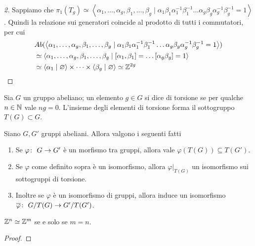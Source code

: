 \begin{proof}[2]
	Sappiamo che $\pi_1(T_g) \simeq \left\langle \alpha_1, \dots, \alpha_g, \beta_1, \dots, \beta_g \mid \alpha_1 \beta_1\alpha^{-1}_1\beta^{-1}_1 \dots \alpha_g \beta_g\alpha^{-1}_g\beta^{-1}_g = 1\right\rangle$. Quindi la relazione sui generatori coincide al prodotto di tutti i commutatori, per cui 
	\begin{equation}
	\begin{aligned}
		& Ab(\left\langle \alpha_1, \dots, \alpha_g, \beta_1, \dots, \beta_g \mid \alpha_1 \beta_1\alpha^{-1}_1\beta^{-1}_1 \dots \alpha_g \beta_g\alpha^{-1}_g\beta^{-1}_g = 1\right\rangle) \\ & \simeq \left\langle \alpha_1, \dots, \alpha_g, \beta_1, \dots, \beta_g \mid \left[\alpha_1, \beta_1\right] = \dots \left[\alpha_g \beta_g\right] = 1\right\rangle\\
		& \simeq \left\langle \alpha_1 \mid \varnothing \right\rangle \times \dots \times \left\langle\beta_g \mid \varnothing \right\rangle \simeq \mathbb{Z}^{2g}
	\end{aligned}
	\end{equation}
\end{proof}

\begin{definition}
	Sia $G$ un gruppo abeliano; un elemento $g \in G$ si dice di torsione se per qualche $n \in \mathbb{N}$ vale $ng = 0$. L'insieme degli elementi di torsione forma il sottogruppo $T(G) \subset G$.
\end{definition}

\begin{lemma}
	Siano $G, G'$ gruppi abeliani. Allora valgono i seguenti fatti
	\begin{enumerate}
		\item Se $\varphi \colon\ G \rightarrow G'$ è un morfismo tra gruppi, allora vale $\varphi(T(G)) \subseteq T(G')$.
		\item Se $\varphi$ come definito sopra è un isomorfismo, allora $\varphi|_{T(G)}$ un isomorfismo sui sottogruppi di torsione.
		\item Inoltre se $\varphi$ è un isomorfismo di gruppi, allora induce un isomorfismo $\overline{\varphi} \colon\ G/T(G) \rightarrow G'/T(G')$.  
	\end{enumerate}
\end{lemma}

\begin{theorem*}
	$\mathbb{Z}^n \simeq \mathbb{Z}^m$ se e solo se $m = n$. 
\end{theorem*}
\begin{proof}
\end{proof}

